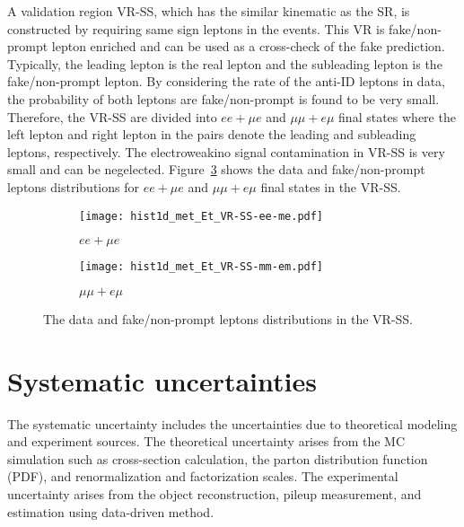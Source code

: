 A validation region VR-SS, which has the similar kinematic as the SR, is constructed by requiring same sign leptons in the events.
This VR is fake/non-prompt lepton enriched and can be used as a cross-check of the fake prediction. 
Typically, the leading lepton is the real lepton and the subleading lepton is the fake/non-prompt lepton.
By considering the rate of the anti-ID leptons in data, the probability of both leptons are fake/non-prompt is found to be very small.
Therefore, the VR-SS are divided into $ee+\mu e$ and $\mu \mu + e\mu$ final states where the left lepton and right lepton in the pairs denote the leading and subleading leptons, respectively.
The electroweakino signal contamination in VR-SS is very small and can be negelected.
Figure~\ref{fig:bkg_fake_distributions} shows the data and fake/non-prompt leptons \met distributions for $ee+\mu e$ and $\mu \mu + e\mu$ final states in the VR-SS.

\begin{figure}[ht]
    \begin{center}
        \begin{subfigure}[b]{0.48\textwidth}
            \texttt{[image: hist1d\_met\_Et\_VR-SS-ee-me.pdf]}
            \caption{$ee+\mu e$}
            \label{fig:bkg_ee_mue_fake_distribution}
        \end{subfigure}
        \begin{subfigure}[b]{0.48\textwidth}
            \texttt{[image: hist1d\_met\_Et\_VR-SS-mm-em.pdf]}
            \caption{$\mu \mu + e\mu$}
            \label{fig:bkg_mumu_emu_fake_distribution}
        \end{subfigure}
        \caption{The data and fake/non-prompt leptons \met distributions in the VR-SS.}
        \label{fig:bkg_fake_distributions}
    \end{center}
\end{figure}


\section{Systematic uncertainties}
\label{sec:bkg_systematic_uncertainties}
The systematic uncertainty includes the uncertainties due to theoretical modeling and experiment sources.
The theoretical uncertainty arises from the MC simulation such as cross-section calculation, the parton distribution function (PDF), and renormalization and factorization scales.
The experimental uncertainty arises from the object reconstruction, pileup measurement, and estimation using data-driven method.

